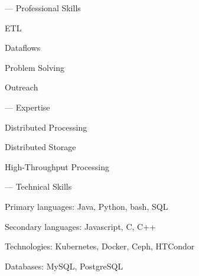 --- Professional Skills

ETL

Dataflows

Problem Solving

Outreach

--- Expertise

Distributed Processing

Distributed Storage

High-Throughput Processing

--- Technical Skills

Primary languages: Java, Python, bash, SQL

Secondary languages: Javascript, C, C++

Technologies: Kubernetes, Docker, Ceph, HTCondor

Databases: MySQL, PostgreSQL
